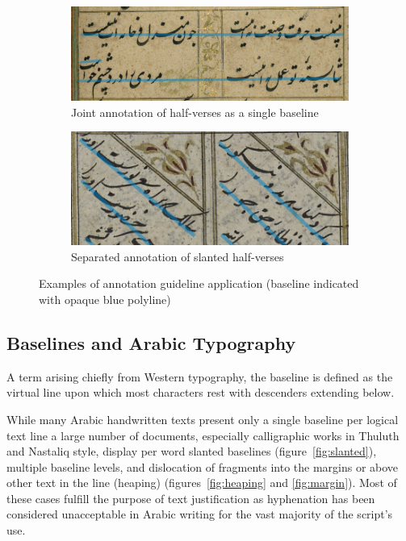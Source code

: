 \begin{figure}
	\begin{subfigure}{.48\textwidth}
		\includegraphics[width=\textwidth]{w619_poetry_anno.jpg}
		\caption{Joint annotation of half-verses as a single baseline}
		\label{fig:anno_poetry}
	\end{subfigure}

	\begin{subfigure}{.48\textwidth}
		\includegraphics[width=\textwidth]{ljs44_slp_anno.jpg}
		\caption{Separated annotation of slanted half-verses}
		\label{fig:anno_slp}
	\end{subfigure}
	\caption{Examples of annotation guideline application (baseline indicated with opaque blue polyline)}
\end{figure}

\subsection{Baselines and Arabic Typography}

A term arising chiefly from Western typography, the baseline is defined as the
virtual line upon which most characters rest with descenders extending below.

While many Arabic handwritten texts present only a single baseline per logical
text line a large number of documents, especially calligraphic works in Thuluth
and Nastaliq style, display per word slanted baselines (figure~\ref{fig:slanted}), multiple baseline levels, and dislocation of fragments into
the margins or above other text in the line (heaping) (figures~\ref{fig:heaping}
and \ref{fig:margin}). Most of these cases fulfill the purpose of text
justification as hyphenation has been considered unacceptable in Arabic writing
for the vast majority of the script's use.

